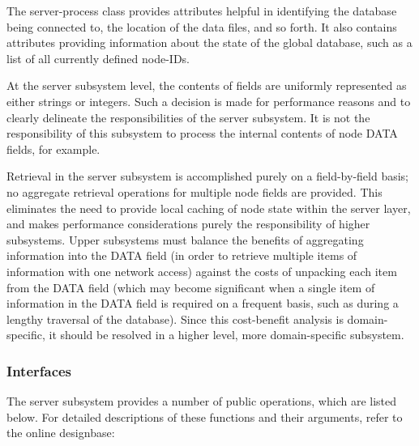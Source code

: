 The server-process class provides attributes helpful in identifying the
database being connected to, the location of the data files, and so forth.
It also contains attributes providing information about the state of 
the global database, such as a list of all currently defined node-IDs.

At the server subsystem level, the contents of fields are uniformly
represented as either strings or integers. Such a decision is made for
performance reasons and to clearly delineate the responsibilities of the
server subsystem.  It is not the responsibility of this subsystem to 
process the internal contents of node DATA fields, for example. 

Retrieval in the server subsystem is accomplished purely on a
field-by-field basis; no aggregate retrieval operations for multiple
node fields are provided.  This eliminates the need to provide local
caching of node state within the server layer, and makes performance
considerations purely the responsibility of higher subsystems.  Upper
subsystems must balance the benefits of aggregating information into
the DATA field (in order to retrieve multiple items of information
with one network access) against the costs of unpacking each item from
the DATA field (which may become significant when a single item of
information in the DATA field is required on a frequent basis, such as
during a lengthy traversal of the database).  Since this cost-benefit
analysis is domain-specific, it should be resolved in a higher level,
more domain-specific subsystem.


\subsubsection{Interfaces}

The server subsystem provides a number of public operations, which are
listed below. For detailed descriptions of these functions and their
arguments, refer to the online designbase:

